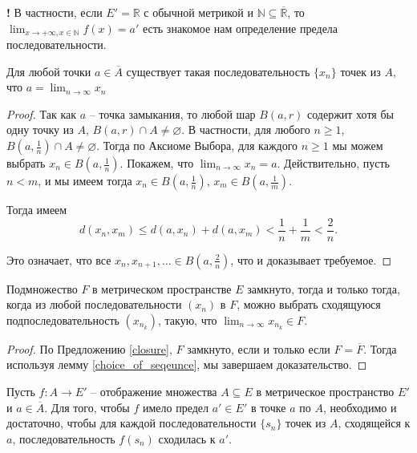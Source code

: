 \begin{mydanger}{\bf{!}}
    В частности, если $E' = \mathbb{R}$ с обычной метрикой и $\mathbb{N} \subseteq \overline{\mathbb{R}}$, то $\lim_{x \to +\infty, x \in \mathbb{{N}}}f(x) =a'$ есть знакомое нам определение предела последовательности.
\end{mydanger}

\begin{lemma}\label{choice_of_seqeunce}
    Для любой точки $a \in \overline{A}$ существует такая последовательность $\{x_n\}$ точек из $A$, что $a = \lim_{n \to \infty} x_n$
\end{lemma}

\begin{proof}
    Так как $a$ -- точка замыкания, то любой шар $B(a, r)$ содержит хотя бы одну точку из $A$, \ie $B(a, r) \cap A \ne \varnothing$. В частности, для любого $n\ge 1$, $B(a, \frac{1}{n}) \cap A \ne \varnothing$. Тогда по Аксиоме Выбора, для каждого $n\ge 1$ мы можем выбрать $x_n \in B(a, \frac{1}{n})$. Покажем, что $\lim_{n \to \infty} x_n = a$. Действительно, пусть $n<m$, и мы имеем тогда $x_n \in B(a, \frac{1}{n})$, $x_m \in B(a, \frac{1}{m})$. 

    Тогда имеем
    \[
     d(x_n, x_m) \le d(a,x_n) + d(a,x_m) <\frac{1}{n} + \frac{1}{m} < \frac{2}{n}.
    \]

Это означает, что все $x_n, x_{n+1}, \ldots \in B(a, \frac{2}{n})$, что и доказывает требуемое.
\end{proof}

\begin{corollary}\label{Weirstrass_mega}
    Подмножество $F$ в метрическом пространстве $E$ замкнуто, тогда и только тогда, когда из любой последовательности $(x_n)$ в $F$, можно выбрать сходящуюся подпоследовательность $(x_{n_k})$, такую, что $\lim_{n\to \infty} x_{n_k} \in F$. 
\end{corollary}

\begin{proof}
    По Предложению \ref{closure}, $F$ замкнуто, если и только если $F = \overline{F}$. Тогда используя лемму \ref{choice_of_seqeunce}, мы завершаем доказательство. 
\end{proof}



\begin{theorem}\label{lim=>for_any_sequence}
    Пусть $f: A \to E'$ -- отображение множества $A \subseteq E$ в метрическое пространство $E'$ и $a \in \overline{A}.$ Для того, чтобы $f$ имело предел $a' \in E'$ в точке $a$ по $A$, необходимо и достаточно, чтобы для каждой последовательности $\{s_n\}$ точек из $A$, сходящейся к $a$, последовательность $f(s  _n)$ сходилась к $a'.$
\end{theorem}

